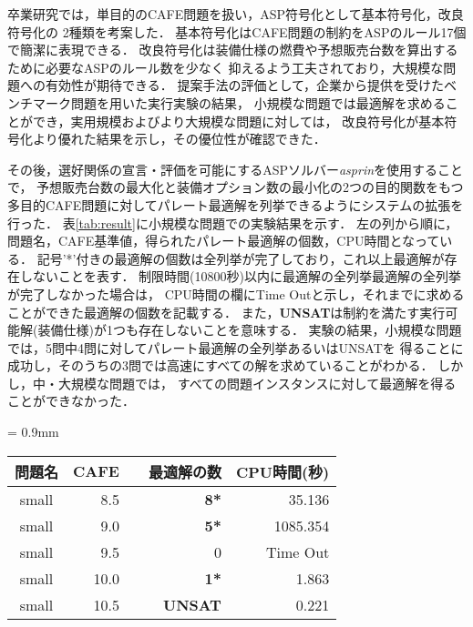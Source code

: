 \documentclass[a4j,10pt]{jarticle}
\begin{document}
\begin{multicols}{1}
卒業研究では，単目的のCAFE問題を扱い，ASP符号化として基本符号化，改良符号化の
2種類を考案した．
基本符号化はCAFE問題の制約をASPのルール17個で簡潔に表現できる．
改良符号化は装備仕様の燃費や予想販売台数を算出するために必要なASPのルール数を少なく
抑えるよう工夫されており，大規模な問題への有効性が期待できる．
提案手法の評価として，企業から提供を受けたベンチマーク問題を用いた実行実験の結果，
小規模な問題では最適解を求めることができ，実用規模およびより大規模な問題に対しては，
改良符号化が基本符号化より優れた結果を示し，その優位性が確認できた．

その後，選好関係の宣言・評価を可能にするASPソルバー{\it asprin}\cite{brewka_15}を使用することで，
予想販売台数の最大化と装備オプション数の最小化の2つの目的関数をもつ
多目的CAFE問題に対してパレート最適解を列挙できるようにシステムの拡張を行った．
表\ref{tab:result}に小規模な問題での実験結果を示す．
左の列から順に，問題名，CAFE基準値，得られたパレート最適解の個数，CPU時間となっている．
記号'*'付きの最適解の個数は全列挙が完了しており，これ以上最適解が存在しないことを表す．
制限時間(10800秒)以内に最適解の全列挙最適解の全列挙が完了しなかった場合は，
CPU時間の欄にTime Outと示し，それまでに求めることができた最適解の個数を記載する．
また，{\bf UNSAT}は制約を満たす実行可能解(装備仕様)が1つも存在しないことを意味する．
実験の結果，小規模な問題では，5問中4問に対してパレート最適解の全列挙あるいはUNSATを
得ることに成功し，そのうちの3問では高速にすべての解を求めていることがわかる．
しかし，中・大規模な問題では，
すべての問題インスタンスに対して最適解を得ることができなかった．

\begin{minipage}{1\linewidth}
 \centering
{}
 \tabcolsep = 0.9mm
 \begin{tabular}{c|r|rr} \hline
  問題名 & CAFE & 最適解の数　& CPU時間(秒) \\ \hline
  small  & 8.5   & {\bf 8*}             & 35.136            \\
  small  & 9.0   & {\bf 5*}             & 1085.354          \\
  small  & 9.5   & 0             & Time Out          \\
  small  & 10.0  & {\bf 1*}             & 1.863             \\
  small  & 10.5  & {\bf UNSAT}         & 0.221             \\ \hline
 \end{tabular}
 \label{tab:result}
\end{minipage}


\end{multicols}
\end{document}
